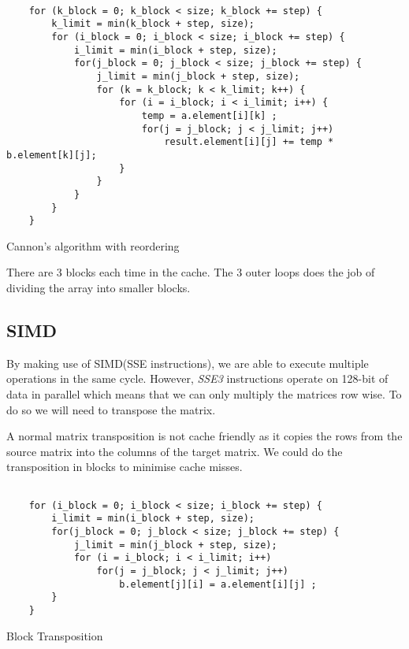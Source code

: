 \documentclass{article}
\begin{document}
\begin{program}[H]
\begin{verbatim}

    for (k_block = 0; k_block < size; k_block += step) {
        k_limit = min(k_block + step, size);
        for (i_block = 0; i_block < size; i_block += step) {
            i_limit = min(i_block + step, size);
            for(j_block = 0; j_block < size; j_block += step) {
                j_limit = min(j_block + step, size);
                for (k = k_block; k < k_limit; k++) {
                    for (i = i_block; i < i_limit; i++) {
                        temp = a.element[i][k] ;
                        for(j = j_block; j < j_limit; j++)
                            result.element[i][j] += temp * b.element[k][j];
                    }
                }
            }
        }
    }
\end{verbatim}
  \caption{Cannon's algorithm with reordering}
\end{program}

There are 3 blocks each time in the cache. The 3 outer loops does the job of dividing the array into smaller blocks.


\subsection{SIMD}

By making use of SIMD(SSE instructions), we are able to execute multiple operations in the same cycle. However, \textit{SSE3} instructions operate on 128-bit of data in parallel which means that we can only multiply the matrices row wise. To do so we will need to transpose the matrix.

A normal matrix transposition is not cache friendly as it copies the rows from the source matrix into the columns of the target matrix. We could do the transposition in blocks to minimise cache misses. 
 

\begin{program}[H]
\begin{verbatim}

    for (i_block = 0; i_block < size; i_block += step) {
        i_limit = min(i_block + step, size);
        for(j_block = 0; j_block < size; j_block += step) {
            j_limit = min(j_block + step, size);
            for (i = i_block; i < i_limit; i++) 
                for(j = j_block; j < j_limit; j++)
                    b.element[j][i] = a.element[i][j] ;                                                
        }
    }
\end{verbatim}
  \caption{Block Transposition}
\end{program}
\end{document}
